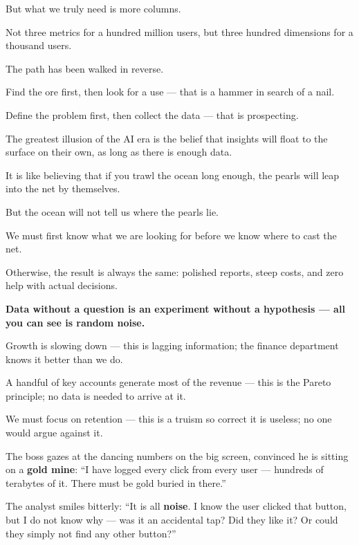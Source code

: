 But what we truly need is more columns.

Not three metrics for a hundred million users, but three hundred dimensions for a thousand users.

\vspace{1em}

The path has been walked in reverse.

Find the ore first, then look for a use --- that is a hammer in search of a nail.

Define the problem first, then collect the data --- that is prospecting.

The greatest illusion of the AI era is the belief that insights will float to the surface on their own, as long as there is enough data.

It is like believing that if you trawl the ocean long enough, the pearls will leap into the net by themselves.

\vspace{1em}

But the ocean will not tell us where the pearls lie.

We must first know what we are looking for before we know where to cast the net.

Otherwise, the result is always the same: polished reports, steep costs, and zero help with actual decisions.

\textbf{Data without a question is an experiment without a hypothesis --- all you can see is random noise.}

\vspace{1em}

{\kaiti Growth is slowing down --- this is lagging information; the finance department knows it better than we do.}

{\kaiti A handful of key accounts generate most of the revenue --- this is the Pareto principle; no data is needed to arrive at it.}

{\kaiti We must focus on retention --- this is a truism so correct it is useless; no one would argue against it.}

The boss gazes at the dancing numbers on the big screen, convinced he is sitting on a \textbf{gold mine}: ``I have logged every click from every user --- hundreds of terabytes of it. There must be gold buried in there.''

The analyst smiles bitterly: ``It is all \textbf{noise}. I know the user clicked that button, but I do not know why --- was it an accidental tap? Did they like it? Or could they simply not find any other button?''

